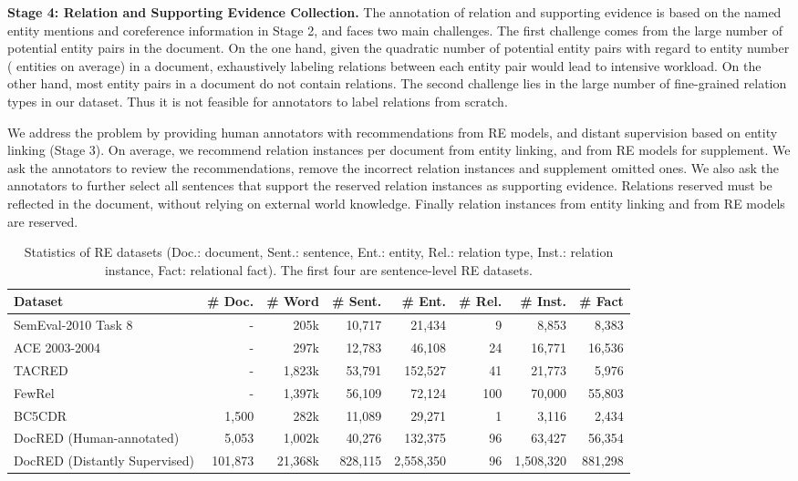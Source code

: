 \documentclass[11pt,a4paper]{article}
\begin{document}
\smallskip
\noindent
\textbf{Stage 4: Relation and Supporting Evidence Collection.}
\label{Sec:Stage 4}
The annotation of relation and supporting evidence is based on the named entity mentions and coreference information in Stage 2, and faces two main challenges. The first challenge comes from the large number of potential entity pairs in the document. On the one hand, given the quadratic number of potential entity pairs with regard to entity number ( entities on average) in a document, exhaustively labeling relations between each entity pair would lead to intensive workload. On the other hand, most entity pairs in a document do not contain relations. The second challenge lies in the large number of fine-grained relation types in our dataset. Thus it is not feasible for annotators to label relations from scratch.

We address the problem by providing human annotators with recommendations from RE models, and distant supervision based on entity linking (Stage 3). On average, we recommend  relation instances per document from entity linking, and  from RE models for supplement. We ask the annotators to review the recommendations, remove the incorrect relation instances and  supplement omitted ones. We also ask the annotators to further select all sentences that support the reserved relation instances as supporting evidence. Relations reserved must be reflected in the document, without relying on external world knowledge. Finally  relation instances from entity linking and   from RE models are reserved.

\begin{table*}
    \centering
    \small
    \begin{tabular}{lrrrrrrr}
    \toprule
    Dataset & \# Doc. & \# Word & \# Sent. & \# Ent. & \# Rel. & \# Inst. &\# Fact \\
    \midrule


    SemEval-2010 Task 8 & - & 205k &10,717& 21,434 & 9 & 8,853 & 8,383\\
    ACE 2003-2004 & - & 297k & 12,783& 46,108 & 24 & 16,771& 16,536\\
TACRED & - & 1,823k&53,791 & 152,527 & 41 &21,773& 5,976\\
    FewRel& - & 1,397k & 56,109 & 72,124 & 100 & 70,000 & 55,803\\
    BC5CDR & 1,500 & 282k &11,089 & 29,271 & 1 & 3,116 & 2,434\\
    DocRED (Human-annotated) & 5,053& 1,002k & 40,276 & 132,375& 96 & 63,427 & 56,354\\
    DocRED (Distantly Supervised) & 101,873& 21,368k & 828,115& 2,558,350& 96 &1,508,320 &881,298\\
    \bottomrule
    \end{tabular}
    \caption{Statistics of RE datasets (Doc.: document, Sent.: sentence, Ent.: entity, Rel.: relation type, Inst.: relation instance, Fact: relational fact). The first four are sentence-level RE datasets.}
    \vspace{-0.5em}
    \label{Table:data_statistics}
\end{table*}
\end{document}
